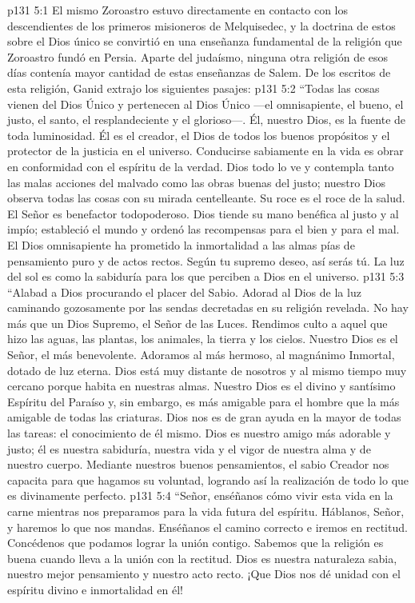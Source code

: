 \vs p131 5:1 El mismo Zoroastro estuvo directamente en contacto con los descendientes de los primeros misioneros de Melquisedec, y la doctrina de estos sobre el Dios único se convirtió en una enseñanza fundamental de la religión que Zoroastro fundó en Persia. Aparte del judaísmo, ninguna otra religión de esos días contenía mayor cantidad de estas enseñanzas de Salem. De los escritos de esta religión, Ganid extrajo los siguientes pasajes:
\vs p131 5:2 \pc “Todas las cosas vienen del Dios Único y pertenecen al Dios Único ---el omnisapiente, el bueno, el justo, el santo, el resplandeciente y el glorioso---. Él, nuestro Dios, es la fuente de toda luminosidad. Él es el creador, el Dios de todos los buenos propósitos y el protector de la justicia en el universo. Conducirse sabiamente en la vida es obrar en conformidad con el espíritu de la verdad. Dios todo lo ve y contempla tanto las malas acciones del malvado como las obras buenas del justo; nuestro Dios observa todas las cosas con su mirada centelleante. Su roce es el roce de la salud. El Señor es benefactor todopoderoso. Dios tiende su mano benéfica al justo y al impío; estableció el mundo y ordenó las recompensas para el bien y para el mal. El Dios omnisapiente ha prometido la inmortalidad a las almas pías de pensamiento puro y de actos rectos. Según tu supremo deseo, así serás tú. La luz del sol es como la sabiduría para los que perciben a Dios en el universo.
\vs p131 5:3 “Alabad a Dios procurando el placer del Sabio. Adorad al Dios de la luz caminando gozosamente por las sendas decretadas en su religión revelada. No hay más que un Dios Supremo, el Señor de las Luces. Rendimos culto a aquel que hizo las aguas, las plantas, los animales, la tierra y los cielos. Nuestro Dios es el Señor, el más benevolente. Adoramos al más hermoso, al magnánimo Inmortal, dotado de luz eterna. Dios está muy distante de nosotros y al mismo tiempo muy cercano porque habita en nuestras almas. Nuestro Dios es el divino y santísimo Espíritu del Paraíso y, sin embargo, es más amigable para el hombre que la más amigable de todas las criaturas. Dios nos es de gran ayuda en la mayor de todas las tareas: el conocimiento de él mismo. Dios es nuestro amigo más adorable y justo; él es nuestra sabiduría, nuestra vida y el vigor de nuestra alma y de nuestro cuerpo. Mediante nuestros buenos pensamientos, el sabio Creador nos capacita para que hagamos su voluntad, logrando así la realización de todo lo que es divinamente perfecto.
\vs p131 5:4 “Señor, enséñanos cómo vivir esta vida en la carne mientras nos preparamos para la vida futura del espíritu. Háblanos, Señor, y haremos lo que nos mandas. Enséñanos el camino correcto e iremos en rectitud. Concédenos que podamos lograr la unión contigo. Sabemos que la religión es buena cuando lleva a la unión con la rectitud. Dios es nuestra naturaleza sabia, nuestro mejor pensamiento y nuestro acto recto. ¡Que Dios nos dé unidad con el espíritu divino e inmortalidad en él!
